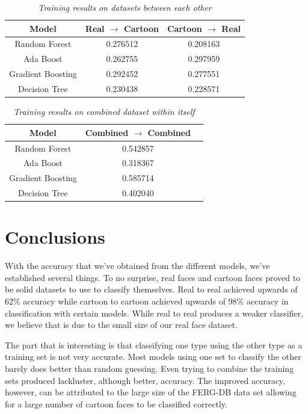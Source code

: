 \documentclass{Project}
\begin{document}
\begin{table}[h!]
\centering
\caption{\textit{Training results on datasets between each other}}
\begin{tabular}{|c|c|c|} \hline
\textbf{Model}      & \textbf{Real $\rightarrow$ Cartoon} & \textbf{Cartoon $\rightarrow$ Real}  \\\hline
Random Forest       & 0.276512                            & 0.208163  \\\hline
Ada Boost           & 0.262755                            & 0.297959  \\\hline
Gradient Boosting   & 0.292452                            & 0.277551  \\\hline
Decision Tree       & 0.230438                            & 0.228571  \\\hline
\end{tabular}
\end{table}

\begin{table}[h!]
\centering
\caption{\textit{Training results on combined dataset within itself}}
\begin{tabular}{|c|c|c|} \hline
\textbf{Model}      & \textbf{Combined $\rightarrow$ Combined} \\\hline
Random Forest       & 0.542857  \\\hline
Ada Boost           & 0.318367  \\\hline
Gradient Boosting   & 0.585714  \\\hline
Decision Tree       & 0.402040  \\\hline
\end{tabular}
\end{table}

\section{Conclusions}
With the accuracy that we've obtained from the different models, we've 
established several things. To no surprise, real faces and cartoon faces proved
to be solid datasets to use to classify themselves. Real to real achieved 
upwards of 62\% accuracy while cartoon to cartoon achieved upwards of 98\% 
accuracy in classification with certain models. While real to real produces a 
weaker classifier, we believe that is due to the small size of our real face dataset.

The part that is interesting is that classifying one type using the other type 
as a training set is not very accurate. Most models using one set to classify the
other barely does better than random guessing. Even trying to combine the training sets produced lackluster, 
although better, accuracy. The improved accuracy, however, can be attributed to the large size of the FERG-DB 
data set allowing for a large number of cartoon faces to be classified correctly.
\end{document}
